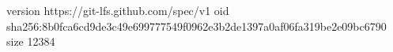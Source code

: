 version https://git-lfs.github.com/spec/v1
oid sha256:8b0fca6cd9de3c49e699777549f0962e3b2de1397a0af06fa319be2e09bc6790
size 12384
